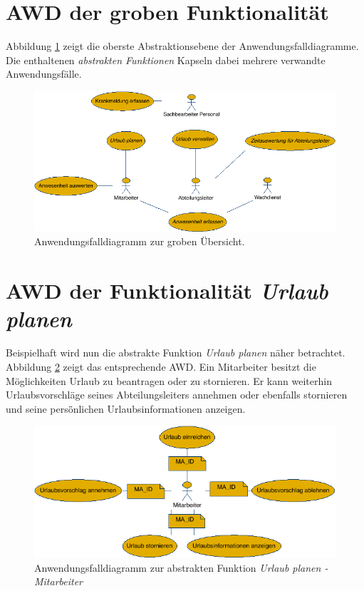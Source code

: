 \section{AWD der groben Funktionalität}
Abbildung \ref{AWD} zeigt die oberste Abstraktionsebene der Anwendungsfalldiagramme. Die enthaltenen \textit{abstrakten Funktionen} Kapseln dabei mehrere verwandte Anwendungsf\"alle.

\vspace{1cm}
\begin{figure}[hbp]
	\centering
	\includegraphics[width=\linewidth]{UML/Export/Grob.png}
	\caption{Anwendungsfalldiagramm zur groben \"Ubersicht.}
	\label{AWD}
\end{figure}

\newpage

\section{AWD der Funktionalität \textit{Urlaub planen}}
Beispielhaft wird nun die abstrakte Funktion \textit{Urlaub planen} n\"aher betrachtet. Abbildung \ref{Urlaubplanen} zeigt das entsprechende AWD. Ein Mitarbeiter besitzt die M\"oglichkeiten Urlaub zu beantragen oder zu stornieren. Er kann weiterhin Urlaubsvorschl\"age seines Abteilungsleiters annehmen oder ebenfalls stornieren und seine pers\"\"onlichen Urlaubsinformationen anzeigen.  

\vspace{1cm}
\begin{figure}[hbp]
	\centering
	\includegraphics[width=\linewidth]{UML/Export/Urlaub_planen.png}
	\caption{Anwendungsfalldiagramm zur abstrakten Funktion \textit{Urlaub planen - Mitarbeiter}}
	\label{Urlaubplanen}
\end{figure}

